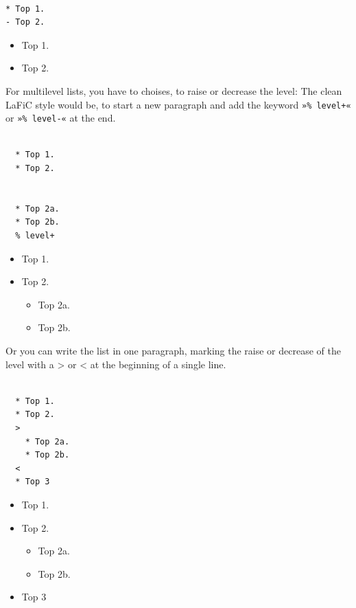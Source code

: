 \documentclass{article}
\begin{document}
\begin{verbatim}

* Top 1.
- Top 2.

\end{verbatim}

\begin{itemize}
\item Top 1.
\item Top 2.

\end{itemize}

For multilevel lists, you have to choises, to raise or
decrease the level: The clean LaFiC style would be,
to start a new paragraph and add the keyword \texttt{»\% level+«}
or \texttt{»\% level-«} at the end.

\begin{verbatim}

  * Top 1.
  * Top 2.


  * Top 2a.
  * Top 2b.
  % level+

\end{verbatim}

\begin{itemize}
\item Top 1.
\item Top 2.

\begin{itemize}
\item Top 2a.
\item Top 2b.

\end{itemize}

\end{itemize}

Or you can write the list in one paragraph, marking the
raise or decrease of the level with a > or < at the
beginning of a single line.

\begin{verbatim}

  * Top 1.
  * Top 2.
  >
    * Top 2a.
    * Top 2b.
  <
  * Top 3

\end{verbatim}

\begin{itemize}
\item Top 1.
\item Top 2.
\begin{itemize}
\item Top 2a.
\item Top 2b.
\end{itemize}
\item Top 3

\end{itemize}
\end{document}
